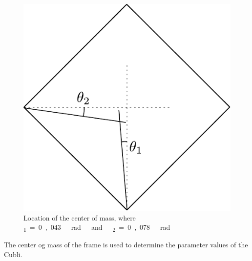 \begin{figure}[H]
	\centering
	\includegraphics[scale=0.5]{figures/centerOfMassDiagram}
	\caption{Location of the center of mass, where \si{\theta_1=0,043\ rad\ and\ \theta_2=0,078\ rad}}
	\label{centerOfMassDiagram}
\end{figure}

The center og mass of the frame is used to determine the parameter values of the Cubli.
